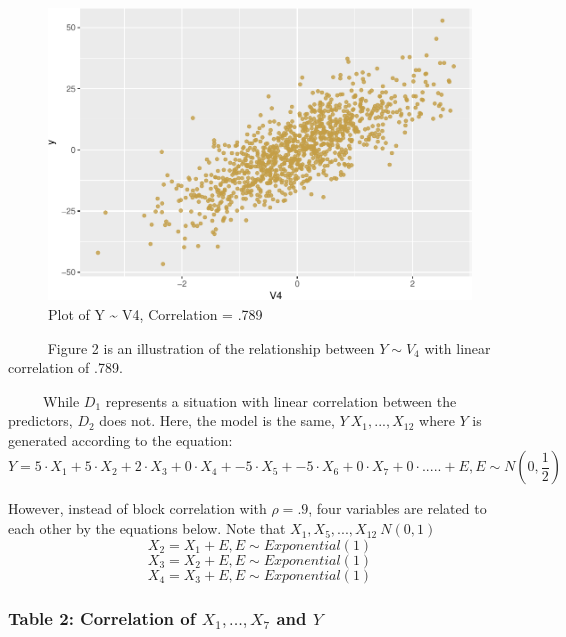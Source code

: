 \documentclass[12pt,twoside]{reedthesis}
\begin{document}
  \begin{figure}[htbp]
  \centering
  \includegraphics{Thesis_files/figure-latex/yv4-1.pdf}
  \caption{\label{fig:yv4}Plot of Y \textasciitilde{} V4, Correlation = .789}
  \end{figure}
  
  ~~~~~ Figure 2 is an illustration of the relationship between
  \(Y\sim V_4\) with linear correlation of .789.
  
  ~~~~~While \(D_1\) represents a situation with linear correlation
  between the predictors, \(D_2\) does not. Here, the model is the same,
  \(Y~X_1,...,X_12\) where \(Y\) is generated according to the equation:
  \[Y = 5 \cdot X_1 + 5 \cdot X_2 + 2 \cdot X_3 + 0 \cdot X_4 + -5 \cdot X_5 + -5\cdot X_6 + 0\cdot X_7 + 0 \cdot ..... + E, E \sim N(0,\frac 1 2 )\]
  
  However, instead of block correlation with \(\rho = .9\), four variables
  are related to each other by the equations below. Note that
  \(X_1, X_5,...,X_{12} ~ N(0,1)\)
  \[X_2 = X_1 + E, E \sim Exponential(1)\]
  \[X_3 = X_2 + E, E \sim Exponential(1)\]
  \[X_4 = X_3 + E, E \sim Exponential(1)\]
  
  \subsubsection{\texorpdfstring{Table 2: Correlation of \(X_1,..., X_7\)
  and
  \(Y\)}{Table 2: Correlation of X\_1,..., X\_7 and Y}}\label{table-2-correlation-of-x_1...-x_7-and-y}
  
\end{document}
